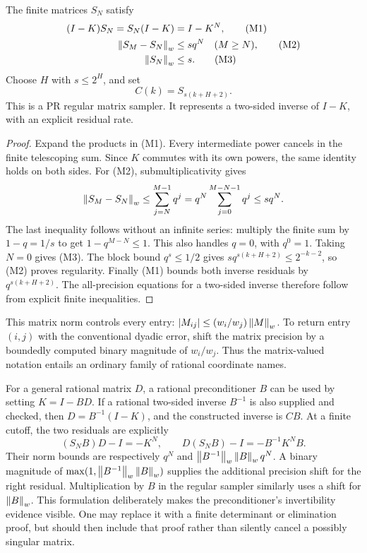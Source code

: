 \begin{theorem}
\label{thm:inverse}
The finite matrices \(S_N\) satisfy
\begin{align}
 (I-K)S_N=S_N(I-K)&=I-K^N,                     \tag{M1}\\
 \left\lVert S_M-S_N\right\rVert_w&\le s q^N\quad(M\ge N),    \tag{M2}\\
 \left\lVert S_N\right\rVert_w&\le s.                          \tag{M3}
\end{align}
Choose \(H\) with \(s\le2^H\), and set
\[
 C(k)=S_{s(k+H+2)}.
\]
This is a PR regular matrix sampler. It represents a two-sided inverse
of \(I-K\), with an explicit residual rate.
\end{theorem}
\begin{proof}
Expand the products in (M1). Every intermediate power cancels in
the finite telescoping sum. Since \(K\) commutes with its own
powers, the same identity holds on both sides.
For (M2), submultiplicativity gives
\[
 \left\lVert S_M-S_N\right\rVert_w\le\sum_{j=N}^{M-1}q^j
 =q^N\sum_{j=0}^{M-N-1}q^j\le s q^N.
\]
The last inequality follows without an infinite series: multiply
the finite sum by \(1-q=1/s\) to get \(1-q^{M-N}\le1\).
This also handles \(q=0\), with \(q^0=1\). Taking \(N=0\)
gives (M3). The block bound \(q^s\le1/2\) gives
\(s q^{s(k+H+2)}\le2^{-k-2}\), so (M2) proves regularity.
Finally (M1) bounds both inverse residuals by \(q^{s(k+H+2)}\).
The all-precision equations for a two-sided inverse therefore follow
from explicit finite inequalities.
\end{proof}

This matrix norm controls every entry:
\(\left|M_{ij}\right|\le(w_i/w_j)\left\lVert M\right\rVert_w\). To return entry
\((i,j)\) with the conventional dyadic error, shift the matrix
precision by a boundedly computed binary magnitude of \(w_i/w_j\).
Thus the matrix-valued notation entails an ordinary family of
rational coordinate names.

For a general rational matrix \(D\), a rational preconditioner
\(B\) can be used by setting \(K=I-BD\). If a rational
two-sided inverse \(B^{-1}\) is also supplied and checked, then
\(D=B^{-1}(I-K)\), and the constructed inverse is \(C B\).
At a finite cutoff, the two residuals are explicitly
\[
 (S_NB)D-I=-K^N,\qquad D(S_NB)-I=-B^{-1}K^NB.
\]
Their norm bounds are respectively \(q^N\) and
\(\left\lVert B^{-1}\right\rVert_w\left\lVert B\right\rVert_w q^N\). A binary magnitude of
\(\max(1,\left\lVert B^{-1}\right\rVert_w\left\lVert B\right\rVert_w)\) supplies the additional
precision shift for the right residual. Multiplication by \(B\)
in the regular sampler similarly uses a shift for \(\left\lVert B\right\rVert_w\).
This formulation deliberately makes the preconditioner's invertibility
evidence visible. One may replace it with a finite determinant or
elimination proof, but should then include that proof rather than
silently cancel a possibly singular matrix.

